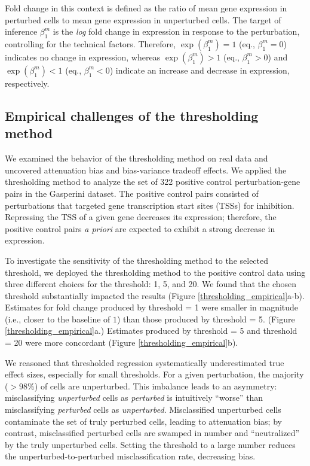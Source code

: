 \documentclass[12pt]{article}
\begin{document}
Fold change in this context is defined as the ratio of mean gene expression in perturbed cells to mean gene expression in unperturbed cells. The target of inference $\beta^m_1$ is the \textit{log} fold change in expression in response to the perturbation, controlling for the technical factors. Therefore, $\exp(\beta^m_1) = 1$ (eq., $\beta^m_1 = 0$) indicates no change in expression, whereas $\exp(\beta^m_1) > 1$ (eq., $\beta^m_1 > 0$) and $\exp(\beta^m_1) < 1$ (eq., $\beta^m_1 < 0$) indicate an increase and decrease in expression, respectively.

\subsection{Empirical challenges of the thresholding method}\label{sec:thresholding_empirical}

We examined the behavior of the thresholding method on real data and uncovered attenuation bias and bias-variance tradeoff effects. We applied the thresholding method to analyze the set of 322 positive control perturbation-gene pairs in the Gasperini dataset. The positive control pairs consisted of perturbations that targeted gene transcription start sites (TSSs) for inhibition. Repressing the TSS of a given gene decreases its expression; therefore, the positive control pairs \textit{a priori} are expected to exhibit a strong decrease in expression.

To investigate the sensitivity of the thresholding method to the selected threshold, we deployed the thresholding method to the positive control data using three different choices for the threshold: 1, 5, and 20. We found that the chosen threshold substantially impacted the results (Figure \ref{thresholding_empirical}a-b). Estimates for fold change produced by threshold = 1 were smaller in magnitude (i.e., closer to the baseline of $1$) than those produced by threshold = 5. (Figure \ref{thresholding_empirical}a.) Estimates produced by threshold = 5 and threshold = 20 were more concordant (Figure \ref{thresholding_empirical}b). 

We reasoned that thresholded regression systematically underestimated true effect sizes, especially for small thresholds. For a given perturbation, the majority ($>98\%$) of cells are unperturbed. This imbalance leads to an asymmetry: misclassifying \textit{unperturbed} cells as \textit{perturbed} is intuitively ``worse'' than misclassifying \textit{perturbed} cells as \textit{unperturbed}. Misclassified unperturbed cells contaminate the set of truly perturbed cells, leading to attenuation bias; by contrast, misclassified perturbed cells are swamped in number and ``neutralized'' by the truly unperturbed cells. Setting the threshold to a large number reduces the unperturbed-to-perturbed misclassification rate, decreasing bias.
\end{document}
